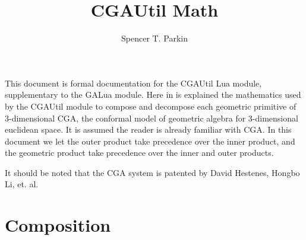\documentclass[12pt]{article}
\title{CGAUtil Math}
\author{Spencer T. Parkin}
\begin{document}
\maketitle

This document is formal documentation for the CGAUtil Lua module,
supplementary to the GALua module.  Here in is explained the
mathematics used by the CGAUtil module to compose and decompose
each geometric primitive of 3-dimensional CGA, the conformal model of geometric algebra
for 3-dimensional euclidean space.  It is assumed the reader is already
familiar with CGA.  In this document we let the outer product take precedence
over the inner product, and the geometric product take precedence over
the inner and outer products.

It should be noted that the CGA system is patented by David Hestenes, Hongbo Li, et. al.

\section{Composition}
\end{document}
